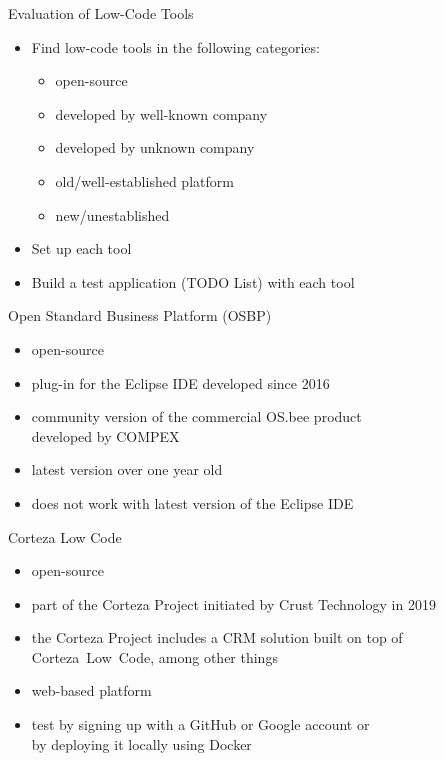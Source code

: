 \documentclass[aspectratio=169]{beamer}
\begin{document}
  \begin{frame}{Evaluation of Low-Code Tools}
    \begin{itemize}
      \item Find low-code tools in the following categories:
          \begin{itemize}
            \item open-source
            \item developed by well-known company
            \item developed by unknown company
            \item old/well-established platform
            \item new/unestablished
          \end{itemize}
      \item Set up each tool
      \item Build a test application (TODO List) with each tool
    \end{itemize}
  \end{frame}

  \begin{frame}{Open Standard Business Platform (OSBP)}
    \begin{itemize}
      \item open-source
      \item plug-in for the Eclipse IDE developed since 2016
      \item community version of the commercial OS.bee product \\
            developed by COMPEX
      \item latest version over one year old
      \item does not work with latest version of the Eclipse IDE
    \end{itemize}
  \end{frame}

  \begin{frame}{Corteza Low Code}
    \begin{itemize}
      \item open-source
      \item part of the Corteza Project initiated by Crust Technology in 2019
      \item the Corteza Project includes a CRM solution built on top of Corteza~Low~Code, among other things
      \item web-based platform
      \item test by signing up with a GitHub or Google account or \\
            by deploying it locally using Docker
    \end{itemize}
  \end{frame}
\end{document}
